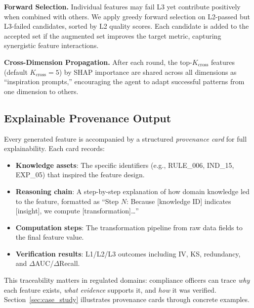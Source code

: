 \textbf{Forward Selection.}
Individual features may fail L3 yet contribute positively when combined with others. We apply greedy forward selection on L2-passed but L3-failed candidates, sorted by L2 quality scores. Each candidate is added to the accepted set if the augmented set improves the target metric, capturing synergistic feature interactions.

\textbf{Cross-Dimension Propagation.}
After each round, the top-$K_{\text{cross}}$ features (default $K_{\text{cross}} = 5$) by SHAP importance are shared across all dimensions as ``inspiration prompts,'' encouraging the agent to adapt successful patterns from one dimension to others.

\subsection{Explainable Provenance Output}
\label{subsec:provenance_method}

Every generated feature is accompanied by a structured \emph{provenance card} for full explainability. Each card records:
\begin{itemize}
    \item \textbf{Knowledge assets}: The specific identifiers (e.g., RULE\_006, IND\_15, EXP\_05) that inspired the feature design.
    \item \textbf{Reasoning chain}: A step-by-step explanation of how domain knowledge led to the feature, formatted as ``Step $N$: Because [knowledge ID] indicates [insight], we compute [transformation]\ldots''
    \item \textbf{Computation steps}: The transformation pipeline from raw data fields to the final feature value.
    \item \textbf{Verification results}: L1/L2/L3 outcomes including IV, KS, redundancy, and $\Delta$AUC/$\Delta$Recall.
\end{itemize}
This traceability matters in regulated domains: compliance officers can trace \emph{why} each feature exists, \emph{what evidence} supports it, and \emph{how} it was verified. Section~\ref{sec:case_study} illustrates provenance cards through concrete examples.
